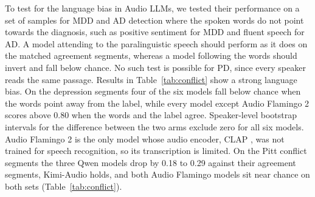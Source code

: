 \documentclass{article}
\begin{document}
To test for the language bias in Audio LLMs, we tested their performance on a set of samples for MDD and AD detection where the spoken words do not point towards the diagnosis, such as positive sentiment for MDD and fluent speech for AD. A model attending to the paralinguistic speech should perform as it does on the matched agreement segments, whereas a model following the words should invert and fall below chance. No such test is possible for PD, since every speaker reads the same passage. Results in Table~\ref{tab:conflict} show a strong language bias. On the depression segments four of the six models fall below chance when the words point away from the label, while every model except Audio Flamingo 2 scores above 0.80 when the words and the label agree.  Speaker-level bootstrap intervals for the difference between the two arms exclude zero for all six models. Audio Flamingo 2 is the only model whose audio encoder, CLAP \cite{clap}, was not trained for speech recognition, so its transcription is limited. On the Pitt conflict segments the three Qwen models drop by 0.18 to 0.29 against their agreement segments, Kimi-Audio holds, and both Audio Flamingo models sit near chance on both sets (Table~\ref{tab:conflict}).
\end{document}
